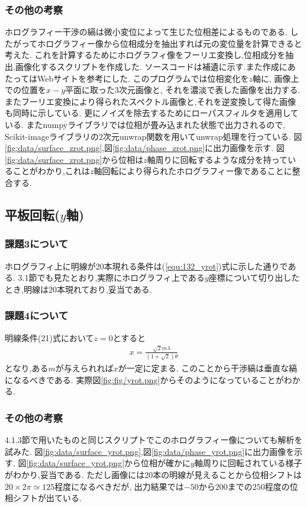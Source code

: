 \subsubsection{その他の考察}
ホログラフィー干渉の縞は微小変位によって生じた位相差によるものである.
したがってホログラフィー像から位相成分を抽出すれば元の変位量を計算できると考えた.
これを計算するためにホログラフィ像をフーリエ変換し,位相成分を抽出,画像化するスクリプトを作成した.
ソースコードは補遺に示す.また作成にあたってはWebサイト\cite{Python}を参考にした.
このプログラムでは位相変化を$z$軸に, 画像上での位置を$x-y$平面に取った3次元画像と,
それを濃淡で表した画像を出力する.またフーリエ変換により得られたスペクトル画像と,それを逆変換して得た画像も同時に示している.
更にノイズを除去するためにローパスフィルタを適用している.
またnumpyライブラリでは位相が畳み込まれた状態で出力されるので,
Scikit-imageライブラリの2次元unwrap関数を用いてunwrap処理を行っている.
図\ref{fig:data/surface_zrot.png},図\ref{fig:data/phase_zrot.png}に出力画像を示す.
図\ref{fig:data/surface_zrot.png}から位相は$z$軸周りに回転するような成分を持っていることがわかり,これは$z$軸回転により得られたホログラフィー像であることに整合する.
\newpage
\subsection{平板回転($y$軸)}
\subsubsection{課題3について}
ホログラフィ上に明線が20本現れる条件は(\ref{equ:132_yrot})式に示した通りである.
3.1節でも見たとおり,実際にホログラフィ上である$y$座標について切り出したとき,明線は20本現れており,妥当である.
\subsubsection{課題4について}
明線条件(21)式において$z=0$とすると
\begin{align}
  x=\frac{\sqrt{2}m\lambda}{(1+\sqrt{2})\theta}
\end{align}
となり,ある$m$が与えられれば$x$が一定に定まる.
このことから干渉縞は垂直な縞になるべきである.
実際図\ref{fig:fig/yrot.png}からそのようになっていることがわかる.
\subsubsection{その他の考察}
4.1.3節で用いたものと同じスクリプトでこのホログラフィー像についても解析を試みた.
図\ref{fig:data/surface_yrot.png},図\ref{fig:data/phase_yrot.png}に出力画像を示す.
図\ref{fig:data/surface_yrot.png}から位相が確かに$y$軸周りに回転されている様子がわかり,妥当である.
ただし画像には20本の明線が見えることから位相シフトは$20\times2\pi\simeq 125$程度になるべきだが,
出力結果では$-50$から$200$までの$250$程度の位相シフトが出ている.
